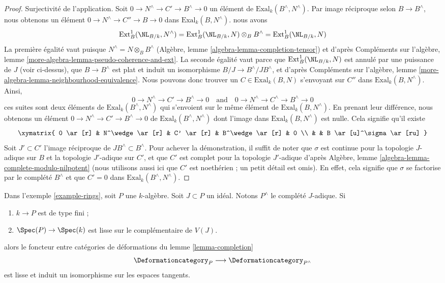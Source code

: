 \begin{proof}
\medskip\noindent
Surjectivité de l'application. Soit $0 \to N^\wedge \to C' \to B^\wedge \to 0$
un élément de $\text{Exal}_k(B^\wedge, N^\wedge)$.
Par image réciproque selon $B \to B^\wedge$, nous obtenons un élément
$0 \to N^\wedge \to C'' \to B \to 0$ dans
$\text{Exal}_k(B, N^\wedge)$.
nous avons
$$
\text{Ext}^1_B(\NL_{B/k}, N^\wedge) =
\text{Ext}^1_B(\NL_{B/k}, N) \otimes_B B^\wedge =
\text{Ext}^1_B(\NL_{B/k}, N)
$$
La première égalité vaut puisque $N^\wedge = N \otimes_B B^\wedge$
(Algèbre, lemme \ref{algebra-lemma-completion-tensor})
et d'après
Compléments sur l'algèbre, lemme \ref{more-algebra-lemma-pseudo-coherence-and-ext}.
La seconde égalité vaut parce que $\text{Ext}^1_B(\NL_{B/k}, N)$
est annulé par une puissance de $J$ (voir ci-dessus), que $B \to B^\wedge$ est plat et induit
un isomorphisme $B/J \to B^\wedge/JB^\wedge$, et d'après
Compléments sur l'algèbre, lemme \ref{more-algebra-lemma-neighbourhood-equivalence}.
Nous pouvons donc trouver un $C \in \text{Exal}_k(B, N)$ s'envoyant sur $C''$ dans
$\text{Exal}_k(B, N^\wedge)$.
Ainsi,
$$
0 \to N^\wedge \to C' \to B^\wedge \to 0
\quad\text{and}\quad
0 \to N^\wedge \to C^\wedge \to B^\wedge \to 0
$$
ces suites sont deux éléments de $\text{Exal}_k(B^\wedge, N^\wedge)$
qui s'envoient sur le même élément de $\text{Exal}_k(B, N^\wedge)$.
En prenant leur différence, nous obtenons un élément
$0 \to N^\wedge \to C' \to B^\wedge \to 0$ de
$\text{Exal}_k(B^\wedge, N^\wedge)$
dont l'image dans $\text{Exal}_k(B, N^\wedge)$ est nulle.
Cela signifie qu'il existe
$$
\xymatrix{
0 \ar[r] &
N^\wedge \ar[r] &
C' \ar[r] &
B^\wedge \ar[r] & 0 \\
& & B \ar[u]^\sigma \ar[ru]
}
$$
Soit $J' \subset C'$ l'image réciproque de $JB^\wedge \subset B^\wedge$.
Pour achever la démonstration, il suffit de noter que
$\sigma$ est continue pour la topologie $J$-adique sur $B$
et la topologie $J'$-adique sur $C'$, et que $C'$ est complet pour la topologie $J'$-adique d'après
Algèbre, lemme \ref{algebra-lemma-complete-modulo-nilpotent}
(nous utilisons aussi ici que $C'$ est noethérien ; un petit détail est omis).
En effet, cela signifie que $\sigma$ se factorise par le
complété $B^\wedge$ et que $C' = 0$ dans $\text{Exal}_k(B^\wedge, N^\wedge)$.
\end{proof}

\begin{lemma}
\label{lemma-smooth-completion}
Dans l'exemple \ref{example-rings}, soit $P$ une $k$-algèbre.
Soit $J \subset P$ un idéal.
Notons $P^\wedge$ le complété $J$-adique. Si
\begin{enumerate}
\item $k \to P$ est de type fini ;
\item $\Spec(P) \to \Spec(k)$ est lisse sur le complémentaire de $V(J)$.
\end{enumerate}
alors le foncteur entre catégories de déformations du
lemme \ref{lemma-completion}
$$
\Deformationcategory_P \longrightarrow \Deformationcategory_{P^\wedge}
$$
est lisse et induit un isomorphisme sur les espaces tangents.
\end{lemma}

